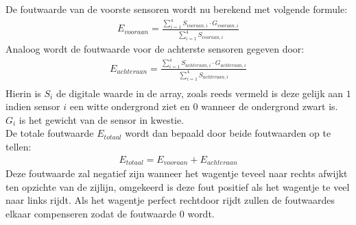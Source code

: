 De foutwaarde van de voorste sensoren wordt nu berekend met volgende formule:
\begin{gather*}
E_{vooraan} = \frac{\sum\limits_{i=1}^{4}S_{vooraan,i}\cdot G_{vooraan,i}}{\sum\limits_{i=1}^{4}S_{vooraan,i}}
\end{gather*}
Analoog wordt de foutwaarde voor de achterste sensoren gegeven door:
\begin{gather*}
E_{achteraan} = \frac{\sum\limits_{i=1}^{4}S_{achteraan,i}\cdot G_{achteraan,i}}{\sum\limits_{i=1}^{4}S_{achteraan,i}}\\
\end{gather*}
Hierin is $S_i$ de digitale waarde in de array, zoals reeds vermeld is deze gelijk aan $1$ indien sensor $i$ een witte ondergrond ziet en $0$ wanneer de ondergrond zwart is. $G_i$ is het gewicht van de sensor in kwestie.\\
De totale foutwaarde $E_{totaal}$ wordt dan bepaald door beide foutwaarden op te tellen:
\begin{gather*}
E_{totaal}=E_{vooraan}+E_{achteraan}
\end{gather*}
Deze foutwaarde zal negatief zijn wanneer het wagentje teveel naar rechts afwijkt ten opzichte van de zijlijn, omgekeerd is deze fout positief als het wagentje te veel naar links rijdt. Als het wagentje perfect rechtdoor rijdt zullen de foutwaardes elkaar compenseren zodat de foutwaarde $0$ wordt. 

